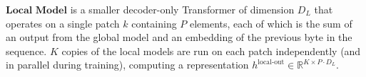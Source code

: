 \documentclass{article}
\newcommand{\h}[1]{h^\text{#1}}%
\newcommand{\inR}[1]{\in\mathbb{R}^{#1}}
\theoremstyle{plain}
\theoremstyle{definition}
\theoremstyle{remark}
\begin{document}






$\textbf{Local Model}$  is a smaller decoder-only Transformer of dimension $D_L$ that operates on a single patch $k$ containing $P$ elements, each of which is the sum of an output from the global model and an embedding of the previous byte in the sequence.
$K$ copies of the local models are run on each patch independently (and in parallel during training), computing a representation $\h{local-out}\inR{K\times P\cdot D_L} $.
\end{document}
